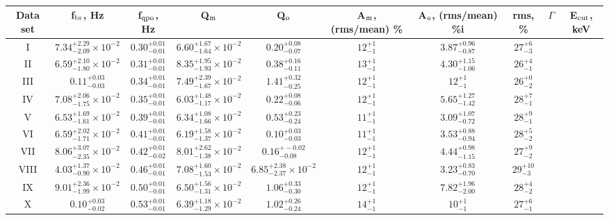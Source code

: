 
\begin{table}
\noindent
\centering
\caption{}
\centering
\begin{tabular}{|c|c|c|c|c|c|c|c|c|c|}
\hline\hline
Data set & f$_{\rm br}$, Hz & f$_{\rm qpo}$, Hz & Q$_{\rm m}$ & Q$_{\rm o}$ & A$_{\rm m}$, (rms/mean) \% & A$_{\rm o}$, (rms/mean) \%i & rms, \% & $\Gamma$ & E$_{\rm cut}$, keV \\
\hline

I & $7.34_{-2.09}^{+2.29}\times10^{-2}$ & $0.30_{-0.01}^{+0.01}$ & $6.60_{-1.64}^{+1.67}\times10^{-2}$ & $0.20_{-0.07}^{+0.08}$ & $12_{-1}^{+1}$ & $3.87_{-0.87}^{+0.96}$ & $27_{-3}^{+6}$ & & \\
II & $6.59_{-1.80}^{+2.10}\times10^{-2}$ & $0.31_{-0.01}^{+0.01}$ & $8.35_{-1.93}^{+1.95}\times10^{-2}$ & $0.38_{-0.11}^{+0.16}$ & $13_{-1}^{+1}$ & $4.30_{-1.06}^{+1.15}$ & $26_{-1}^{+4}$ & & \\
III & $0.11_{-0.03}^{+0.03}$ & $0.34_{-0.01}^{+0.01}$ & $7.49_{-1.67}^{+2.39}\times10^{-2}$ & $1.41_{-0.25}^{+0.32}$ & $12_{-1}^{+1}$ & $12_{-1}^{+1}$ & $26_{-2}^{+0}$ & & \\
IV & $7.08_{-1.75}^{+2.06}\times10^{-2}$ & $0.35_{-0.01}^{+0.01}$ & $6.03_{-1.17}^{+1.48}\times10^{-2}$ & $0.22_{-0.06}^{+0.08}$ & $12_{-1}^{+1}$ & $5.65_{-1.42}^{+1.27}$ & $28_{-1}^{+7}$ & & \\
V & $6.53_{-1.61}^{+1.69}\times10^{-2}$ & $0.39_{-0.01}^{+0.01}$ & $6.34_{-1.66}^{+1.08}\times10^{-2}$ & $0.53_{-0.24}^{+0.23}$ & $11_{-1}^{+1}$ & $3.09_{-0.72}^{+1.07}$ & $28_{-1}^{+9}$ & & \\
VI & $6.59_{-1.71}^{+2.02}\times10^{-2}$ & $0.41_{-0.01}^{+0.01}$ & $6.19_{-1.37}^{+1.58}\times10^{-2}$ & $0.10_{-0.03}^{+0.03}$ & $11_{-1}^{+1}$ & $3.53_{-0.94}^{+0.88}$ & $28_{-2}^{+5}$ & & \\
VII & $8.06_{-2.35}^{+3.07}\times10^{-2}$ & $0.42_{-0.02}^{+0.01}$ & $8.01_{-1.38}^{+2.62}\times10^{-2}$ & $0.16_{-0.08}^{+-0.02}$ & $12_{-1}^{+1}$ & $4.44_{-1.15}^{+0.98}$ & $27_{-2}^{+9}$ & & \\
VIII & $4.03_{-0.90}^{+1.37}\times10^{-2}$ & $0.46_{-0.01}^{+0.01}$ & $7.08_{-1.53}^{+1.60}\times10^{-2}$ & $6.85_{-2.37}^{+2.38}\times10^{-2}$ & $12_{-1}^{+1}$ & $3.23_{-0.70}^{+0.83}$ & $29_{-3}^{+10}$ & & \\
IX & $9.01_{-1.99}^{+2.36}\times10^{-2}$ & $0.50_{-0.01}^{+0.01}$ & $6.50_{-1.31}^{+1.56}\times10^{-2}$ & $1.06_{-0.30}^{+0.33}$ & $12_{-1}^{+1}$ & $7.82_{-2.00}^{+1.96}$ & $28_{-2}^{+4}$ & & \\
X & $0.10_{-0.02}^{+0.03}$ & $0.53_{-0.01}^{+0.01}$ & $6.39_{-1.29}^{+1.18}\times10^{-2}$ & $1.02_{-0.24}^{+0.26}$ & $14_{-1}^{+1}$ & $10_{-1}^{+1}$ & $27_{-1}^{+6}$ & & \\

\end{tabular}
\end{table}
